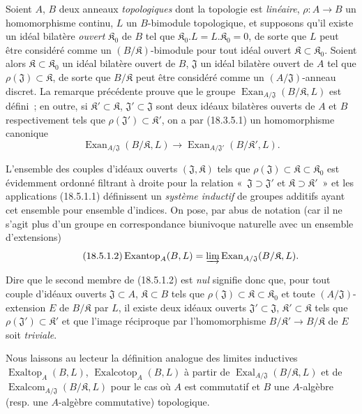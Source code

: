 \begin{env}[18.5.1]
\label{0.18.5.1-fr}
Soient $A$, $B$ deux anneaux \emph{topologiques} dont la topologie est
\emph{linéaire}, $\rho:A\to B$ un homomorphisme continu, $L$ un $B$-bimodule
topologique, et supposons qu'il existe un idéal bilatère \emph{ouvert}
$\mathfrak K_0$ de $B$ tel que
$\mathfrak K_0.L=L.\mathfrak K_0=0$, de sorte que $L$ peut être
considéré comme un $(B/\mathfrak K)$-bimodule pour tout idéal ouvert
$\mathfrak K\subset\mathfrak K_0$. Soient alors
$\mathfrak K\subset\mathfrak K_0$ un idéal bilatère ouvert de $B$,
$\mathfrak J$ un idéal bilatère ouvert de $A$ tel que
$\rho(\mathfrak J)\subset\mathfrak K$, de sorte que $B/\mathfrak K$ peut être
considéré comme un $(A/\mathfrak J)$-anneau discret. La remarque précédente
prouve que le groupe
$\operatorname{Exan}_{A/\mathfrak J}(B/\mathfrak K,L)$ est défini~; en outre,
si $\mathfrak K'\subset\mathfrak K$, $\mathfrak J'\subset\mathfrak J$ sont
deux idéaux bilatères ouverts de $A$ et $B$ respectivement tels que
$\rho(\mathfrak J')\subset\mathfrak K'$, on a par (18.3.5.1) un homomorphisme
canonique
\begin{equation}
\label{0.18.5.1.1-fr}
\tag{18.5.1.1}
  \operatorname{Exan}_{A/\mathfrak J}(B/\mathfrak K,L)
  \longrightarrow
  \operatorname{Exan}_{A/\mathfrak J'}(B/\mathfrak K',L).
\end{equation}

L'ensemble des couples d'idéaux ouverts $(\mathfrak J,\mathfrak K)$ tels que
$\rho(\mathfrak J)\subset\mathfrak K\subset\mathfrak K_0$ est évidemment
ordonné filtrant à droite pour la relation «~$\mathfrak J\supset\mathfrak J'$
et $\mathfrak K\supset\mathfrak K'$~» et les applications (18.5.1.1)
définissent un \emph{système inductif} de groupes additifs ayant cet ensemble
pour ensemble d'indices. On pose, par abus de notation (car il ne s'agit plus
d'un groupe en correspondance biunivoque naturelle avec un ensemble
d'extensions)
\begin{equation}
\label{0.18.5.1.2-fr}
\tag{18.5.1.2}
  \operatorname{Exantop}_A(B,L)
  =\varinjlim\operatorname{Exan}_{A/\mathfrak J}(B/\mathfrak K,L).
\end{equation}

Dire que le second membre de (18.5.1.2) est \emph{nul} signifie donc que, pour
tout couple d'idéaux ouverts $\mathfrak J\subset A$, $\mathfrak K\subset B$
tels que $\rho(\mathfrak J)\subset\mathfrak K\subset\mathfrak K_0$ et toute
$(A/\mathfrak J)$-extension $E$ de $B/\mathfrak K$ par $L$, il existe deux
idéaux ouverts $\mathfrak J'\subset\mathfrak J$,
$\mathfrak K'\subset\mathfrak K$ tels que
$\rho(\mathfrak J')\subset\mathfrak K'$ et que l'image réciproque par
l'homomorphisme $B/\mathfrak K'\to B/\mathfrak K$ de $E$ soit \emph{triviale}.

Nous laissons au lecteur la définition analogue des limites inductives
$\operatorname{Exaltop}_A(B,L)$, $\operatorname{Exalcotop}_A(B,L)$ à partir de
$\operatorname{Exal}_{A/\mathfrak J}(B/\mathfrak K,L)$ et de
$\operatorname{Exalcom}_{A/\mathfrak J}(B/\mathfrak K,L)$ pour le cas où $A$
est commutatif et $B$ une $A$-algèbre (resp. une $A$-algèbre commutative)
topologique.
\end{env}

